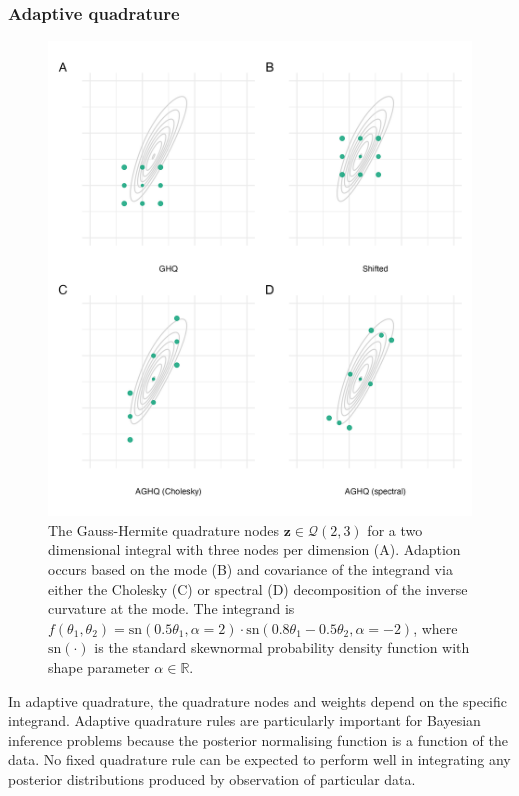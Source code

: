\documentclass[a4paper, nobind]{templates/ociamthesis}
\newcommand{\z}{\mathbf{z}}
\begin{document}
\hypertarget{adaptive-quadrature}{%
\subsubsection{Adaptive quadrature}\label{adaptive-quadrature}}



\begin{figure}

{\centering \includegraphics[width=0.95\linewidth]{figures/naomi-aghq/aghq-demo} 

}

\caption{The Gauss-Hermite quadrature nodes \(\z \in \mathcal{Q}(2, 3)\) for a two dimensional integral with three nodes per dimension (A). Adaption occurs based on the mode (B) and covariance of the integrand via either the Cholesky (C) or spectral (D) decomposition of the inverse curvature at the mode. The integrand is \(f(\theta_1, \theta_2) = \text{sn}(0.5 \theta_1, \alpha = 2) \cdot \text{sn}(0.8 \theta_1 - 0.5 \theta_2, \alpha = -2)\), where \(\text{sn}(\cdot)\) is the standard skewnormal probability density function with shape parameter \(\alpha \in \mathbb{R}\).}\label{fig:aghq-demo}
\end{figure}

In adaptive quadrature, the quadrature nodes and weights depend on the specific integrand.
Adaptive quadrature rules are particularly important for Bayesian inference problems because the posterior normalising function is a function of the data.
No fixed quadrature rule can be expected to perform well in integrating any posterior distributions produced by observation of particular data.
\end{document}
